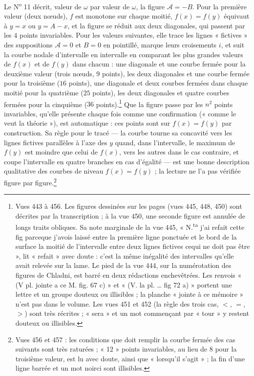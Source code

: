 \documentclass[11pt,a4paper]{article}
\begin{document}
Le N\textsuperscript{o} 11 décrit, valeur de $\omega$ par valeur de $\omega$, la figure
$\mathcal{A} = -B$. Pour la première valeur (deux nœuds), $f$ est monotone sur chaque
moitié, $f(x) = f(y)$ équivaut à $y = x$ ou $y = A - x$, et la figure se réduit aux deux
diagonales, qui passent par les $4$ points invariables. Pour les valeurs suivantes,
elle trace les lignes « fictives » des suppositions $\mathcal{A} = 0$ et $B = 0$ en
pointillé, marque leurs croisements $i$, et suit la courbe nodale d'intervalle en
intervalle en comparant les plus grandes valeurs de $f(x)$ et de $f(y)$ dans chacun :
une diagonale et une courbe fermée pour la deuxième valeur (trois nœuds, $9$ points),
les deux diagonales et une courbe fermée pour la troisième ($16$ points), une
diagonale et deux courbes fermées dans chaque moitié pour la quatrième ($25$ points),
les deux diagonales et quatre courbes fermées pour la cinquième ($36$
points).\footnote{Vues 443 à 456. Les figures dessinées sur les pages (vues 445, 448,
450) sont décrites par la transcription ; à la vue 450, une seconde figure est annulée
de longs traits obliques. Sa note marginale de la vue 445, « N.\textsuperscript{ta}
j'ai refait cette fig parceque j'avois laissé entre la première ligne ponctuée et le
bord de la surface la moitié de l'intervalle entre deux lignes fictives cequi ne doit
pas être », lit « refait » avec doute : c'est la même inégalité des intervalles
qu'elle avait relevée sur la lame. Le pied de la vue 444, sur la numérotation des
figures de Chladni, est barré en deux rédactions enchevêtrées. Les renvois « (V pl.
jointe a ce M. fig. 67 c) » et « (V. la pl. … fig 72 a) » portent une lettre et un
groupe douteux ou illisibles ; la planche « jointe à ce mémoire » n'est pas dans le
volume. Les vues 451 et 452 (la règle des trois cas, $<$, $=$, $>$) sont très
récrites ; « sera » et un mot commençant par « tour » y restent douteux ou illisibles.}
Que la figure passe par les $n^2$ points invariables, qu'elle présente chaque fois
comme une confirmation (« comme le veut la théorie »), est automatique : ces points
sont sur $f(x) = f(y)$ par construction. Sa règle pour le tracé — la courbe tourne sa
concavité vers les lignes fictives parallèles à l'axe des $y$ quand, dans l'intervalle,
le maximum de $f(y)$ est moindre que celui de $f(x)$, vers les autres dans le cas
contraire, et coupe l'intervalle en quatre branches en cas d'égalité — est une bonne
description qualitative des courbes de niveau $f(x) = f(y)$ ; la lecture ne l'a pas
vérifiée figure par figure.\footnote{Vues 456 et 457 : les conditions que doit remplir
la courbe fermée des cas suivants sont très raturées ; « 12 » points invariables, au
lieu de 8 pour la troisième valeur, est lu avec doute, ainsi que « lorsqu'il s'agit » ;
la fin d'une ligne barrée et un mot noirci sont illisibles.}
\end{document}
